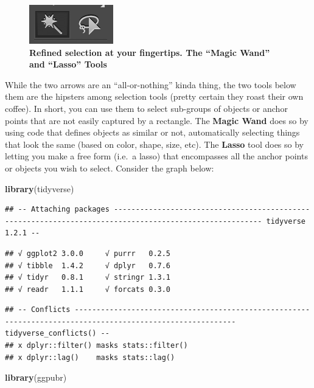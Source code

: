 \documentclass[]{article}
\newenvironment{Shaded}{\begin{snugshade}}{\end{snugshade}}
\newcommand{\KeywordTok}[1]{\textcolor[rgb]{0.13,0.29,0.53}{\textbf{#1}}}
\newcommand{\NormalTok}[1]{#1}
\begin{document}
\begin{figure}
\centering
\includegraphics{ToolII.png}
\caption{\textbf{Refined selection at your fingertips. The ``Magic
Wand'' and ``Lasso'' Tools}}
\end{figure}

While the two arrows are an ``all-or-nothing'' kinda thing, the two
tools below them are the hipsters among selection tools (pretty certain
they roast their own coffee). In short, you can use them to select
sub-groups of objects or anchor points that are not easily captured by a
rectangle. The \textbf{Magic Wand} does so by using code that defines
objects as similar or not, automatically selecting things that look the
same (based on color, shape, size, etc). The \textbf{Lasso} tool does so
by letting you make a free form (i.e.~a lasso) that encompasses all the
anchor points or objects you wish to select. Consider the graph below:

\begin{Shaded}
\begin{Highlighting}[]
\KeywordTok{library}\NormalTok{(tidyverse)}
\end{Highlighting}
\end{Shaded}

\begin{verbatim}
## -- Attaching packages -------------------------------------------------------------------------------------------------------- tidyverse 1.2.1 --
\end{verbatim}

\begin{verbatim}
## √ ggplot2 3.0.0     √ purrr   0.2.5
## √ tibble  1.4.2     √ dplyr   0.7.6
## √ tidyr   0.8.1     √ stringr 1.3.1
## √ readr   1.1.1     √ forcats 0.3.0
\end{verbatim}

\begin{verbatim}
## -- Conflicts ----------------------------------------------------------------------------------------------------------- tidyverse_conflicts() --
## x dplyr::filter() masks stats::filter()
## x dplyr::lag()    masks stats::lag()
\end{verbatim}

\begin{Shaded}
\begin{Highlighting}[]
\KeywordTok{library}\NormalTok{(ggpubr)}
\end{Highlighting}
\end{Shaded}
\end{document}
